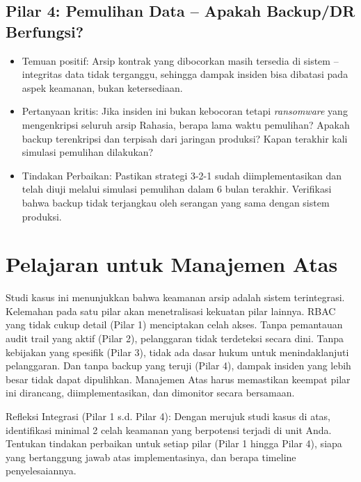 \documentclass[12pt,a4paper]{report}
\begin{document}
\subsection{Pilar 4: Pemulihan Data -- Apakah Backup/DR Berfungsi?}
\begin{itemize}[leftmargin=*]
    \item Temuan positif: Arsip kontrak yang dibocorkan masih tersedia di sistem -- integritas data tidak terganggu, sehingga dampak insiden bisa dibatasi pada aspek keamanan, bukan ketersediaan.
    \item Pertanyaan kritis: Jika insiden ini bukan kebocoran tetapi \textit{ransomware} yang mengenkripsi seluruh arsip Rahasia, berapa lama waktu pemulihan? Apakah backup terenkripsi dan terpisah dari jaringan produksi? Kapan terakhir kali simulasi pemulihan dilakukan?
    \item Tindakan Perbaikan: Pastikan strategi 3-2-1 sudah diimplementasikan dan telah diuji melalui simulasi pemulihan dalam 6 bulan terakhir. Verifikasi bahwa backup tidak terjangkau oleh serangan yang sama dengan sistem produksi.
\end{itemize}

\section{Pelajaran untuk Manajemen Atas}
Studi kasus ini menunjukkan bahwa keamanan arsip adalah sistem terintegrasi. Kelemahan pada satu pilar akan menetralisasi kekuatan pilar lainnya. RBAC yang tidak cukup detail (Pilar 1) menciptakan celah akses. Tanpa pemantauan audit trail yang aktif (Pilar 2), pelanggaran tidak terdeteksi secara dini. Tanpa kebijakan yang spesifik (Pilar 3), tidak ada dasar hukum untuk menindaklanjuti pelanggaran. Dan tanpa backup yang teruji (Pilar 4), dampak insiden yang lebih besar tidak dapat dipulihkan. Manajemen Atas harus memastikan keempat pilar ini dirancang, diimplementasikan, dan dimonitor secara bersamaan.

\begin{outputbox}
Refleksi Integrasi (Pilar 1 s.d. Pilar 4): Dengan merujuk studi kasus di atas, identifikasi minimal 2 celah keamanan yang berpotensi terjadi di unit Anda. Tentukan tindakan perbaikan untuk setiap pilar (Pilar 1 hingga Pilar 4), siapa yang bertanggung jawab atas implementasinya, dan berapa timeline penyelesaiannya.
\end{outputbox}

\end{document}
